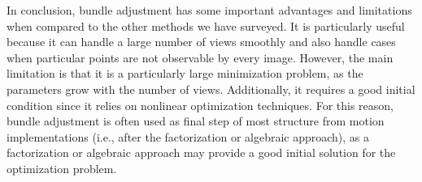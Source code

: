 \documentclass[a4paper, 12pt]{article}
\numberwithin{equation}{section}
\begin{document}
In conclusion, bundle adjustment has some important advantages and limitations when compared to the other methods we have surveyed. It is particularly useful because it can handle a large number of views smoothly and also handle cases when particular points are not observable by every image. However, the main limitation is that it is a particularly large minimization problem, as the parameters grow with the number of views. Additionally, it requires a good initial condition since it relies on nonlinear optimization techniques. For this reason, bundle adjustment is often used as final step of most structure from motion implementations (i.e., after the factorization or algebraic approach), as a factorization or algebraic approach may provide a good initial solution for the optimization problem. 
\end{document}
